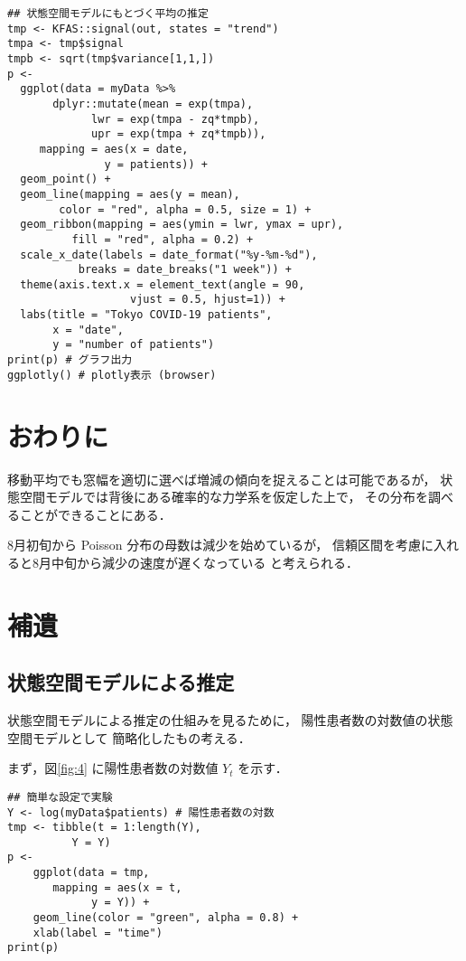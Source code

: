 \documentclass[10pt,oneside,fleqn]{scrartcl}
\begin{document}
\begin{verbatim}
## 状態空間モデルにもとづく平均の推定
tmp <- KFAS::signal(out, states = "trend")
tmpa <- tmp$signal
tmpb <- sqrt(tmp$variance[1,1,])
p <-
  ggplot(data = myData %>%
	   dplyr::mutate(mean = exp(tmpa),
			 lwr = exp(tmpa - zq*tmpb),
			 upr = exp(tmpa + zq*tmpb)),
	 mapping = aes(x = date,
		       y = patients)) +
  geom_point() +
  geom_line(mapping = aes(y = mean),
	    color = "red", alpha = 0.5, size = 1) +
  geom_ribbon(mapping = aes(ymin = lwr, ymax = upr),
	      fill = "red", alpha = 0.2) +
  scale_x_date(labels = date_format("%y-%m-%d"), 
	       breaks = date_breaks("1 week")) + 
  theme(axis.text.x = element_text(angle = 90, 
				   vjust = 0.5, hjust=1)) +
  labs(title = "Tokyo COVID-19 patients",
       x = "date",
       y = "number of patients")
print(p) # グラフ出力
ggplotly() # plotly表示 (browser)
\end{verbatim}

\section{おわりに}
\label{sec:orgc538cf5}

移動平均でも窓幅を適切に選べば増減の傾向を捉えることは可能であるが，
状態空間モデルでは背後にある確率的な力学系を仮定した上で，
その分布を調べることができることにある．

8月初旬から Poisson 分布の母数は減少を始めているが，
信頼区間を考慮に入れると8月中旬から減少の速度が遅くなっている
と考えられる．

\section{補遺}
\label{sec:org30efe99}
\subsection{状態空間モデルによる推定}
\label{sec:org6f48e40}

状態空間モデルによる推定の仕組みを見るために，
陽性患者数の対数値の状態空間モデルとして
簡略化したもの考える．

まず，図\ref{fig:4} に陽性患者数の対数値 \(Y_{t}\) を示す．
\begin{figure}[htbp]
  \centering
  \myGraph*{}
\end{figure}

\begin{verbatim}
## 簡単な設定で実験
Y <- log(myData$patients) # 陽性患者数の対数
tmp <- tibble(t = 1:length(Y),
	      Y = Y)
p <- 
    ggplot(data = tmp, 
	   mapping = aes(x = t,
			 y = Y)) +
    geom_line(color = "green", alpha = 0.8) +
    xlab(label = "time")
print(p)
\end{verbatim}
\end{document}
